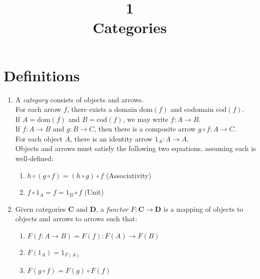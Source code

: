 \documentclass{article} %
\title{\textbf{1}\\Categories}
\begin{document}
\maketitle

\section*{Definitions}
\begin{enumerate}
    \item A \textit{category} consists of objects and arrows.
    \\For each arrow $f$, there exists a domain $\text{dom}(f)$ and codomain $\text{cod}(f)$. 
    \\If $A=\text{dom}(f)$ and $B=\text{cod}(f)$, we may write $f:A\rightarrow B$. 
    \\If $f:A\rightarrow B$ and $g:B\rightarrow C$, then there is a composite arrow $g\circ f:A\rightarrow C$.
    \\For each object $A$, there is an identity arrow $1_A:A\rightarrow A$.
    \\Objects and arrows must satisfy the following two equations, assuming each is well-defined:
    \begin{enumerate}
        \item $h\circ (g\circ f)=(h\circ g)\circ f$ (Associativity)
        \item $f\circ 1_A=f=1_B\circ f$ (Unit)
    \end{enumerate}
    \item Given categories \textbf{C} and \textbf{D}, a \textit{functor} $F:\textbf{C}\rightarrow\textbf{D}$ is a mapping of objects to objects and arrows to arrows such that:
    \begin{enumerate}
        \item $F(f:A\rightarrow B)=F(f):F(A)\rightarrow F(B)$
        \item $F(1_A)=1_{F(A)}$
        \item $F(g\circ f)=F(g)\circ F(f)$
    \end{enumerate}
\end{enumerate}
\end{document}
